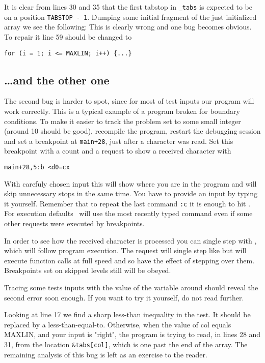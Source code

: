 It is clear from lines 30 and 35 that the first tabstop in
\verb|_tabs| is expected to be on a position \hbox{{\tt TABSTOP - 1}}.
Dumping some initial fragment of the just initialized array 
we see the following:
This is clearly wrong and one bug becomes obvious.
To repair it line 59 should be changed to
\begin{exmpl}
	\verb|for (i = 1; i <= MAXLIN; i++) {...}|
\end{exmpl}

\subsection{\ldots{}and the other one}

The second bug is harder to spot, since for most of test inputs our
program will work correctly.
This is a typical example of a program broken for boundary conditions.
To make it easier to track the problem set
 to some small integer (around 10 should be good),
recompile the program, restart the debugging session and set a breakpoint
at \verb|main+28|, just after a character was read.
Set this breakpoint with a count and a request 
to show a received character with
\begin{exmpl}
	{\tt main+28,5:b <d0=cx}
\end{exmpl}
With carefuly chosen input this will show where you are in the
program and will skip unnecessary stops in the same time.
You have to provide an input by typing it yourself.
Remember that to repeat the last command  {\tt :c} it is enough to hit
.
For execution defaults \szadb\ will use the most recently typed command
even if some other requests were executed by breakpoints.

In order to see how the received character is processed you can single step
with , which will follow program execution.
The request  will single step like  but will
execute function calls at full speed and so have the
effect of stepping over them. Breakpoints set on skipped
levels still will be obeyed.

Tracing some tests inputs with the value of the variable  around
 should reveal the second error soon enough.  If you
want to try it yourself, do not read further.

Looking at line 17 we find a sharp less-than inequality in the test. It should
be replaced by a less-than-equal-to. Otherwise, when the value of col
equals MAXLIN, and your input is "right", the program is trying to read, in
lines 28 and 31, from the location \verb|&tabs[col]|,
which is one past the end of the array.
The remaining analysis of this bug is left as an exercise to the reader.



